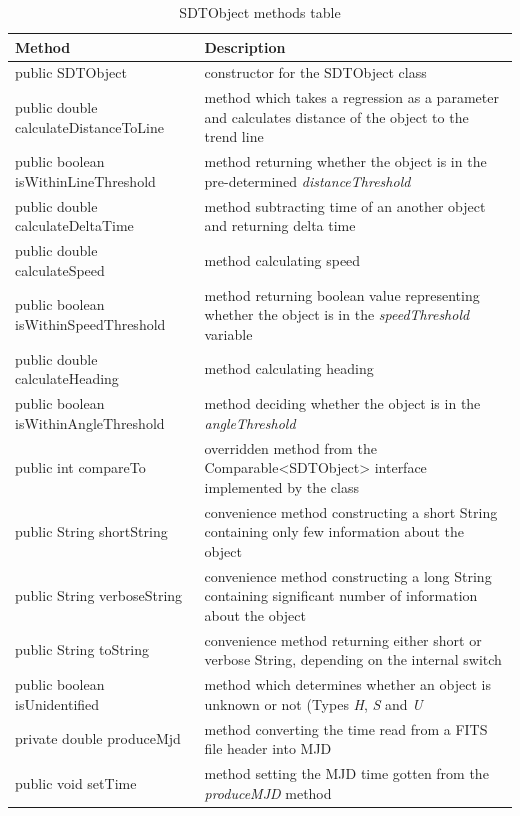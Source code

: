 \begin{table}[H]
\centering
\setlength{\extrarowheight}{2pt}
\begin{tabularx}{\textwidth}{|X|X|}
\hline
\textbf{Method} & \textbf{Description} \\ \hline
public \mbox{SDTObject} & constructor for the SDTObject class \\ \hline
public double \mbox{calculateDistanceToLine} & method which takes a regression as a parameter and calculates distance of the object to the trend line \\ \hline
public boolean \mbox{isWithinLineThreshold} & method returning whether the object is in the pre-determined \emph{distanceThreshold} \\ \hline
public double \mbox{calculateDeltaTime} & method subtracting time of an another object and returning delta time \\ \hline
public double \mbox{calculateSpeed} & method calculating speed \\ \hline
public boolean \mbox{isWithinSpeedThreshold} & method returning boolean value representing whether the object is in the \emph{speedThreshold} variable \\ \hline
public double \mbox{calculateHeading} & method calculating heading \\ \hline
public boolean \mbox{isWithinAngleThreshold} & method deciding whether the object is in the \emph{angleThreshold} \\ \hline
public int \mbox{compareTo} & overridden method from the Comparable<SDTObject> interface implemented by the class \\ \hline
public String \mbox{shortString} & convenience method constructing a short String containing only few information about the object \\ \hline
public String \mbox{verboseString} & convenience method constructing a long String containing significant number of information about the object \\ \hline
public String \mbox{toString} & convenience method returning either short or verbose String, depending on the internal switch \\ \hline
public boolean \mbox{isUnidentified} & method which determines whether an object is unknown or not (Types \emph{H}, \emph{S} and \emph{U} \\ \hline
private double \mbox{produceMjd} & method converting the time read from a FITS file header into MJD \\ \hline
public void \mbox{setTime} & method setting the MJD time gotten from the \emph{produceMJD} method \\ \hline
\end{tabularx}
\caption{SDTObject methods table}
\label{tab:class_methods_O}
\end{table}

